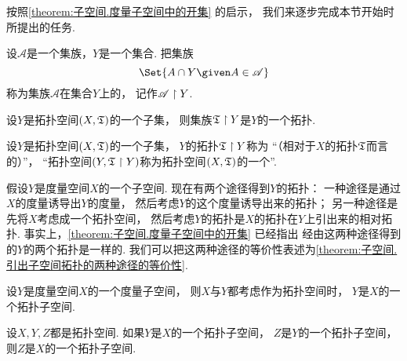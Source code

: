 按照\cref{theorem:子空间.度量子空间中的开集} 的启示，
我们来逐步完成本节开始时所提出的任务.

\begin{definition}\label{definition:子空间.拓扑子空间中的集族的限制}
设\(\mathscr{A}\)是一个集族，\(Y\)是一个集合.
把集族\begin{equation*}
	\Set{ A \cap Y \given A \in \mathscr{A} }
\end{equation*}称为集族\(\mathscr{A}\)在集合\(Y\)上的，
记作\(\mathscr{A} \upharpoonright Y\).
\end{definition}

\begin{lemma}
设\(Y\)是拓扑空间\((X,{\mathfrak T})\)的一个子集，
则集族\({\mathfrak T} \upharpoonright Y\)是\(Y\)的一个拓扑.
\end{lemma}

\begin{definition}
设\(Y\)是拓扑空间\((X,{\mathfrak T})\)的一个子集，
\(Y\)的拓扑\({\mathfrak T} \upharpoonright Y\)称为
“（相对于\(X\)的拓扑\({\mathfrak T}\)而言的）”，
“拓扑空间\((Y,{\mathfrak T} \upharpoonright Y)\)称为拓扑空间\((X,{\mathfrak T})\)的一个”.
\end{definition}

假设\(Y\)是度量空间\(X\)的一个子空间.
现在有两个途径得到\(Y\)的拓扑：
一种途径是通过\(X\)的度量诱导出\(Y\)的度量，
然后考虑\(Y\)的这个度量诱导出来的拓扑；
另一种途径是先将\(X\)考虑成一个拓扑空间，
然后考虑\(Y\)的拓扑是\(X\)的拓扑在\(Y\)上引出来的相对拓扑.
事实上，\cref{theorem:子空间.度量子空间中的开集} 已经指出
经由这两种途径得到的\(Y\)的两个拓扑是一样的.
我们可以把这两种途径的等价性表述为\cref{theorem:子空间.引出子空间拓扑的两种途径的等价性}.
\begin{theorem}\label{theorem:子空间.引出子空间拓扑的两种途径的等价性}
设\(Y\)是度量空间\(X\)的一个度量子空间，
则\(X\)与\(Y\)都考虑作为拓扑空间时，
\(Y\)是\(X\)的一个拓扑子空间.
\end{theorem}

\begin{theorem}\label{theorem:子空间.亲子空间的传递性}
设\(X,Y,Z\)都是拓扑空间.
如果\(Y\)是\(X\)的一个拓扑子空间，
\(Z\)是\(Y\)的一个拓扑子空间，
则\(Z\)是\(X\)的一个拓扑子空间.
\end{theorem}

